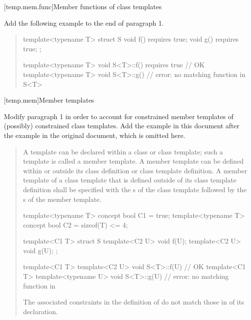[temp.mem.func]{Member functions of class templates}

Add the following example to the end of paragraph 1.

\begin{quote}
\begin{addedblock}
\enterexample
\begin{codeblock}
template<typename T> struct S {
  void f() requires true;
  void g() requires true;
};

template<typename T> 
  void S<T>::f() requires true { } // OK
template<typename T> 
  void S<T>::g() { }               // error: no matching function in S<T>
\end{codeblock}
\exitexample
\end{addedblock}
\end{quote}


[temp.mem]{Member templates}

Modify paragraph 1 in order to account for constrained member templates
of (possibly) constrained class templates. Add the example in this
document after the example in the original document, which is omitted
here.

\begin{quote}
\pnum
A template can be declared within a class or class template; such a 
template is called a member template. 
% 
A member template can be defined within or outside its class definition 
or class template definition. 
% 
A member template of a class template that is defined outside of its 
class template definition shall be specified with the 
s 
of the class template followed by the 
s
of the member template.
% 
\enterexample
\begin{codeblock}
template<typename T> concept bool C1 = true;
template<typename T> concept bool C2 = sizeof(T) <= 4;

template<C1 T>
  struct S {
    template<C2 U> void f(U);
    template<C2 U> void g(U);
  };

template<C1 T> template<C2 U> 
  void S<T>::f(U) { } // OK
template<C1 T> template<typename U> 
  void S<T>::g(U) { } // error: no matching function in 
\end{codeblock}
The associated constraints in the definition of  do not
match those in of its declaration.
\exitexample
\end{quote}


